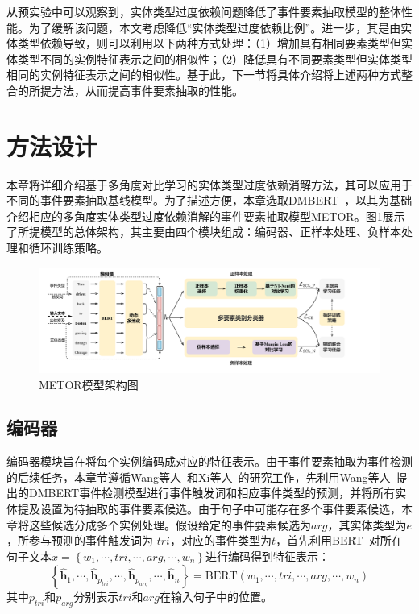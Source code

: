 从预实验中可以观察到，实体类型过度依赖问题降低了事件要素抽取模型的整体性能。为了缓解该问题，本文考虑降低“实体类型过度依赖比例”。进一步，其是由实体类型依赖导致，则可以利用以下两种方式处理：（1）增加具有相同要素类型但实体类型不同的实例特征表示之间的相似性；（2）降低具有不同要素类型但实体类型相同的实例特征表示之间的相似性。基于此，下一节将具体介绍将上述两种方式整合的所提方法，从而提高事件要素抽取的性能。

\section{方法设计}
本章将详细介绍基于多角度对比学习的实体类型过度依赖消解方法，其可以应用于不同的事件要素抽取基线模型。为了描述方便，本章选取DMBERT~\cite{wang2019adversarial}，以其为基础介绍相应的多角度实体类型过度依赖消解的事件要素抽取模型METOR。图\ref{framework}展示了所提模型的总体架构，其主要由四个模块组成：编码器、正样本处理、负样本处理和循环训练策略。

\begin{figure}[htp]
    \centering
   \includegraphics[width=1\linewidth]{figures/chap4/framework_metor.pdf}
   \caption{METOR模型架构图}
   \label{framework}
\end{figure}

\subsection{编码器}
编码器模块旨在将每个实例编码成对应的特征表示。由于事件要素抽取为事件检测的后续任务，本章节遵循Wang等人~\cite{wang2019hmeae}和Xi等人~\cite{xiangyu2021capturing}的研究工作，先利用Wang等人~\cite{wang2019hmeae}提出的DMBERT事件检测模型进行事件触发词和相应事件类型的预测，并将所有实体提及设置为待抽取的事件要素候选。由于句子中可能存在多个事件要素候选，本章将这些候选分成多个实例处理。假设给定的事件要素候选为$arg$，其实体类型为$e$，所参与预测的事件触发词为
$tri$，对应的事件类型为$t$，首先利用BERT~\cite{devlin2019bert}对所在句子文本$x=\left\{w_{1},\cdots,tri,\cdots ,arg, \cdots, w_{n}\right\}$进行编码得到特征表示：
\begin{equation}
  \left\{\boldsymbol{\hat{h}}_{1},\cdots,\boldsymbol{\hat{h}}_{p_{tri}},\cdots,\boldsymbol{\hat{h}}_{p_{arg}},\cdots,\boldsymbol{\hat{h}}_{n}\right\}=\textrm{BERT}(w_{1},\cdots, tri,\cdots, arg, \cdots, w_{n})
\end{equation}
其中$p_{tri}$和$p_{arg}$分别表示$tri$和$arg$在输入句子中的位置。

